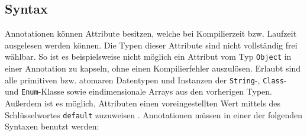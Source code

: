 \subsection{Syntax}
\label{java_annotationen_syntax}
\noindent Annotationen können Attribute besitzen, welche bei Kompilierzeit bzw. Laufzeit ausgelesen werden können. Die Typen dieser Attribute sind nicht vollständig frei wählbar. So ist es beispielsweise nicht möglich ein Attribut vom Typ \texttt{Object} in einer Annotation zu kapseln, ohne einen Kompilierfehler auszulösen. Erlaubt sind alle primitiven bzw. atomaren Datentypen und Instanzen der \texttt{String}-, \texttt{Class}- und \texttt{Enum}-Klasse sowie eindimensionale Arrays aus den vorherigen Typen. Außerdem ist es möglich, Attributen einen voreingestellten Wert mittels des Schlüsselwortes \texttt{default} zuzuweisen \cite{Gosling2005}. Annotationen müssen in einer der folgenden Syntaxen benutzt werden:
